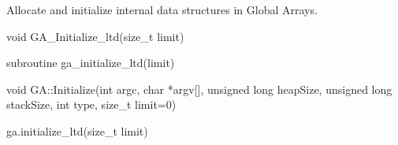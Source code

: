 \documentclass[12pt]{article}
\begin{document}
\gcoll

\begin{desc}

Allocate and initialize internal data structures in Global Arrays.

\end{desc}



\begin{capi}
\begin{ccode}
void GA_Initialize_ltd(size_t limit)
\end{ccode}
\begin{funcargs}
\end{funcargs}
\end{capi}

\begin{fapi}
\begin{fcode}
subroutine ga_initialize_ltd(limit)
\end{fcode}
\begin{funcargs}
\end{funcargs}
\end{fapi}

\begin{cxxapi}
\begin{cxxcode}
void GA::Initialize(int argc, char *argv[], unsigned long heapSize,
                    unsigned long stackSize, int type, size_t limit=0)
\end{cxxcode}
\begin{funcargs}
\end{funcargs}
\end{cxxapi}

\begin{pyapi}
\begin{pycode}
ga.initialize_ltd(size_t limit)
\end{pycode}
\begin{funcargs}
\end{funcargs}
\end{pyapi}
\end{document}
